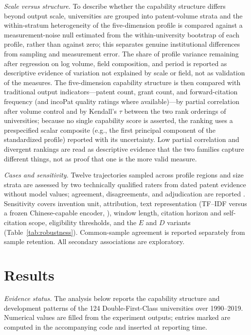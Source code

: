 \emph{Scale versus structure.} To describe whether the capability structure
differs beyond output scale, universities are grouped into patent-volume
strata and the within-stratum heterogeneity of the five-dimension profile is
compared against a measurement-noise null estimated from the within-university
bootstrap of each profile, rather than against zero; this separates genuine
institutional differences from sampling and measurement error. The share of
profile variance remaining after regression on log volume, field composition,
and period is reported as descriptive evidence of variation not explained by
scale or field, not as validation of the measures. The five-dimension
capability structure is then compared with traditional output
indicators---patent count, grant count, and forward-citation frequency (and
incoPat quality ratings where available)---by partial correlation after
volume control and by Kendall's $\tau$ between the two rank orderings of
universities; because no single capability score is asserted, the ranking
uses a prespecified scalar composite (e.g., the first principal component of
the standardized profile) reported with its uncertainty. Low partial
correlation and divergent rankings are read as descriptive evidence that the
two families capture different things, not as proof that one is the more
valid measure.

\emph{Cases and sensitivity.} Twelve trajectories sampled across profile
regions and size strata are assessed by two technically qualified raters from
dated patent evidence without model values; agreement, disagreements, and
adjudication are reported \citep{cohen1960}. Sensitivity covers invention
unit, attribution, text representation (TF--IDF versus a frozen
Chinese-capable encoder, \citealp{reimers2019}), window length, citation
horizon and self-citation scope, eligibility thresholds, and the $E$ and $D$
variants (Table~\ref{tab:robustness}). Common-sample agreement is reported
separately from sample retention. All secondary associations are exploratory.

\section{Results}\label{sec:results}
\emph{Evidence status.} The analysis below reports the capability structure
and development patterns of the 124 Double-First-Class universities over
1990--2019. Numerical values are filled from the experiment outputs; entries
marked \pending{} are computed in the accompanying code and inserted at
reporting time.

